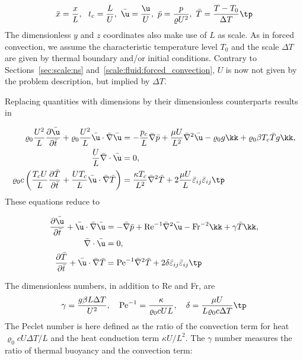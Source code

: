 \documentclass[graybox,envcountchap,sectrefs,final]{svmonodo}
\begin{document}
\[ \bar x = \frac{x}{L},\ \ t_c = \frac{L}{U},\ 
\bar\u = \frac{\u}{U},\ \bar p = \frac{p}{\varrho U^2},\ 
\bar T = \frac{T-T_0}{\Delta T}\tp\]
The dimensionless $y$ and $z$ coordinates also make use of $L$ as scale.
As in forced convection, we assume the characteristic temperature
level $T_0$ and the scale $\Delta T$ are given by thermal boundary and/or
initial conditions.
Contrary to Sections~\ref{sec:scale:ns} and~\ref{scale:fluid:forced_convection},
$U$ is now not given by the problem description, but implied by
$\Delta T$.

Replacing quantities with dimensions by their dimensionless counterparts
results in

\begin{align*}
\varrho_0\frac{U^2}{L}\frac{\partial \bar\u}{\partial \bar t} +
\varrho_0\frac{U^2}{L}\bar \u\cdot\bar \nabla\bar\u
&= -\frac{p_c}{L}\bar\nabla \bar p + \frac{\mu U}{L^2}
\bar \nabla^2\bar \u - \varrho_0g\kk + \varrho_0\beta T_c\bar T g\kk,
\\ 
\frac{U}{L}\bar\nabla\cdot\bar\u & = 0,
\\ 
\varrho_0 c\left(\frac{T_c U}{L}
\frac{\partial \bar T}{\partial \bar t} +
\frac{UT_c}{L}\bar\u\cdot\bar\nabla \bar T\right)
&= \frac{\kappa T_c}{L^2}
\bar \nabla^2 \bar T + 2\frac{\mu U}{L}
\bar\varepsilon_{ij}\bar\varepsilon_{ij}\tp
\end{align*}
These equations reduce to

\begin{align}
\frac{\partial \bar\u}{\partial \bar t} +
\bar \u\cdot\bar \nabla\bar\u
&= -\bar\nabla \bar p + \hbox{Re}^{-1}\bar \nabla^2\bar \u
- \hbox{Fr}^{-2}\kk  + \gamma \bar T\kk,
\label{scale:fluid:free_convection:eq:momentum_TB0}\\ 
\bar\nabla\cdot\bar\u & = 0,
\label{scale:fluid:free_convection:eq:cont_TB0}\\ 
\frac{\partial \bar T}{\partial \bar t} +
\bar\u\cdot\bar\nabla \bar T
&= \hbox{Pe}^{-1}\bar \nabla^2 \bar T + 2\delta
\bar\varepsilon_{ij}\bar\varepsilon_{ij}\tp
\label{scale:fluid:free_convection:eq:energy_TB0}
\end{align}

The dimensionless numbers, in addition to Re and Fr, are
\[
\gamma = \frac{g\beta L\Delta T }{U^2},\quad
\hbox{Pe}^{-1} = \frac{\kappa }{\varrho_0 c UL},\quad
\delta = \frac{\mu U}{L\varrho_0 c \Delta T}\tp
\]
The Peclet number is here defined as the ratio of the
convection term for heat $\varrho_0 c U\Delta T/L$ and the
heat conduction term $\kappa U/L^2$.
The $\gamma$ number measures the ratio of thermal buoyancy and
the convection term:
\end{document}
